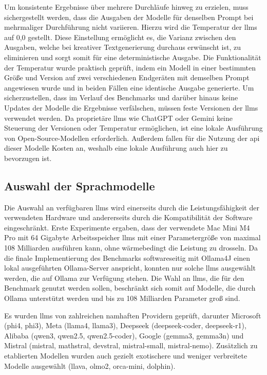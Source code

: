Um konsistente Ergebnisse über mehrere Durchläufe hinweg zu erzielen, muss sichergestellt werden, dass die Ausgaben der Modelle für denselben Prompt bei mehrmaliger Durchführung nicht variieren.
Hierzu wird die Temperatur der \glspl{llm} auf 0,0 gestellt.
Diese Einstellung ermöglicht es, die Varianz zwischen den Ausgaben, welche bei kreativer Textgenerierung durchaus erwünscht ist, zu eliminieren und sorgt somit für eine deterministische Ausgabe.
Die Funktionalität der Temperatur wurde praktisch geprüft, indem ein Modell in einer bestimmten Größe und Version auf zwei verschiedenen Endgeräten mit demselben Prompt angewiesen wurde und in beiden Fällen eine identische Ausgabe generierte.
Um sicherzustellen, dass im Verlauf des Benchmarks und darüber hinaus keine Updates der Modelle die Ergebnisse verfälschen, müssen feste Versionen der \glspl{llm} verwendet werden.
Da proprietäre \glspl{llm} wie ChatGPT oder Gemini keine Steuerung der Versionen oder Temperatur ermöglichen, ist eine lokale Ausführung von Open-Source-Modellen erforderlich.
Außerdem fallen für die Nutzung der \gls{api} dieser Modelle Kosten an, weshalb eine lokale Ausführung auch hier zu bevorzugen ist.


\subsection{Auswahl der Sprachmodelle}\label{sec:modelle-benchmark}

Die Auswahl an verfügbaren \glspl{llm} wird einerseits durch die Leistungsfähigkeit der verwendeten Hardware und andererseits durch die Kompatibilität der Software eingeschränkt.
Erste Experimente ergaben, dass der verwendete Mac Mini M4 Pro mit 64 Gigabyte Arbeitsspeicher \glspl{llm} mit einer Parametergröße von maximal 108 Milliarden ausführen kann, ohne wärmebedingt die Leistung zu drosseln.
Da die finale Implementierung des Benchmarks softwareseitig mit Ollama4J einen lokal ausgeführten Ollama-Server anspricht, konnten nur solche \glspl{llm} ausgewählt werden, die auf Ollama zur Verfügung stehen.
Die Wahl an \glspl{llm}, die für den Benchmark genutzt werden sollen, beschränkt sich somit auf Modelle, die durch Ollama unterstützt werden und bis zu 108 Milliarden Parameter groß sind.

Es wurden \glspl{llm} von zahlreichen namhaften Providern geprüft, darunter Microsoft (phi4, phi3), Meta (llama4, llama3), Deepseek (deepseek-coder, deepseek-r1), Alibaba (qwen3, qwen2.5, qwen2.5-coder), Google (gemma3, gemma3n) und Mistral (mistral, mathstral, devstral, mistral-small, mistral-nemo).
Zusätzlich zu etablierten Modellen wurden auch gezielt exotischere und weniger verbreitete Modelle ausgewählt (llava, olmo2, orca-mini, dolphin).

